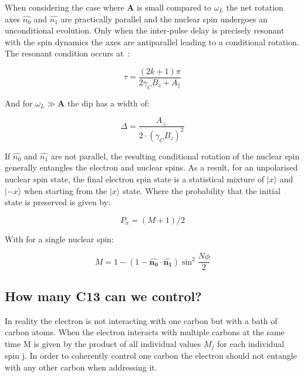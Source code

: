 When considering the case where $\mathbf{A}$ is small compared to  $\omega_L$ the net rotation axes  $\hat{n_0}$ and $\hat{n_1}$ are practically parallel and the nuclear spin undergoes an unconditional evolution. Only when the inter-pulse delay is precisely resonant with the spin dynamics the axes are antiparallel leading to a conditional rotation. The resonant condition occurs at~\citep{Taminiau2012Detection}:

 \begin{equation}
\tau = \frac{(2k+1)\pi}{2 \gamma_C B_z + A_\parallel}
\label{eq:res_dip_loc}
\end{equation}

And for $\omega_L \gg \mathbf{A}$ the dip has a width of:

 \begin{equation}
\Delta = \frac{A_\perp}{2\cdot (\gamma_C B_z)^2}
\label{eq:res_dip_width}
\end{equation}

If  $\hat{n_0}$ and $\hat{n_1}$ are not parallel, the resulting conditional rotation of the nuclear spin generally entangles the electron and nuclear spins. As a result, for an unpolarised nuclear spin state, the final electron spin state is a statistical mixture of $|x\rangle$ and $|-x\rangle$ when starting from the $|x\rangle$  state. Where the probability that the initial state is preserved is given by:


\begin{equation}
P_x = (M+1)/2
\end{equation}

With for a single nuclear spin:


\begin{equation}
M = 1-(1 - \hat{\mathbf{n_0}} \cdot \hat{\mathbf{n_1}}) \sin^2 \frac{N\phi}{2}
\end{equation}

\subsection{How many C13 can we control?}
\label{howmanyc13canwecontrol}

In reality the electron is not interacting with one carbon but with a bath of carbon atoms. When the electron interacts with multiple carbons at the same time M is given by the product of all individual values $M_j$ for each individual spin j. In order to coherently control one carbon the electron should not entangle with any other carbon when addressing it.

